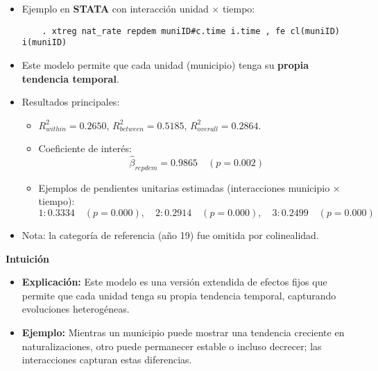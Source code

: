 \documentclass[12pt]{article}
\begin{document}
\begin{itemize}
    \item Ejemplo en \textbf{STATA} con interacción unidad × tiempo:
    \begin{verbatim}
    . xtreg nat_rate repdem muniID#c.time i.time , fe cl(muniID) i(muniID)
    \end{verbatim}
    
    \item Este modelo permite que cada unidad (municipio) tenga su \textbf{propia tendencia temporal}.
    
    \item Resultados principales:
    \begin{itemize}
        \item $R^2_{within} = 0.2650$, $R^2_{between} = 0.5185$, $R^2_{overall} = 0.2864$.
        \item Coeficiente de interés:
        \[
        \hat{\beta}_{repdem} = 0.9865 \quad (p = 0.002)
        \]
        \item Ejemplos de pendientes unitarias estimadas (interacciones municipio × tiempo):
        \[
        1: 0.3334 \quad (p = 0.000), \quad
        2: 0.2914 \quad (p = 0.000), \quad
        3: 0.2499 \quad (p = 0.000)
        \]
    \end{itemize}
    
    \item Nota: la categoría de referencia (año 19) fue omitida por colinealidad.
\end{itemize}

\noindent\textbf{Intuición}
\begin{itemize}
    \item \textbf{Explicación:} Este modelo es una versión extendida de efectos fijos que permite que cada unidad tenga su propia tendencia temporal, capturando evoluciones heterogéneas.
    \item \textbf{Ejemplo:} Mientras un municipio puede mostrar una tendencia creciente en naturalizaciones, otro puede permanecer estable o incluso decrecer; las interacciones capturan estas diferencias.
\end{itemize}
\end{document}
